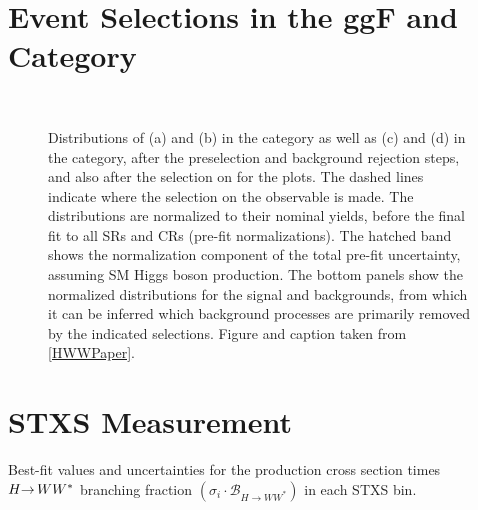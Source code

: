 \FloatBarrier
\section{Event Selections in the ggF \ZeroJet and \OneJet Category}

\begin{figure}[!h]
    \centering
     \\
  \caption{
  Distributions of (a) \mll and (b) \dphill in the \ZeroJet category as well as (c) \mll and (d) \dphill in the \OneJet category, after the preselection and background rejection steps, and also after the selection on \mll for the \dphill plots. The dashed lines indicate where the selection on the observable is made. The distributions are normalized to
  their nominal yields, before the final fit to all SRs and CRs (pre-fit normalizations). The hatched band shows the normalization component of the total pre-fit uncertainty, assuming SM Higgs boson production. The bottom panels show the normalized distributions for the signal and backgrounds, from which it can be inferred which background processes are primarily removed by the indicated selections.
  Figure and caption taken from \cref{HWWPaper}. 
  \label{fig:ggf:Plots:selections}
  }
  \end{figure}
  

\FloatBarrier
\section{STXS Measurement}
\label{app:stxs-measurement}
\begin{table}[htp]
    \caption{
    Best-fit values and uncertainties for the production cross section times $H{\rightarrow\,}WW^{\ast}$ branching fraction $({\sigma_i \cdot \mathcal{B}_{H \to WW^{\ast}}})$ in each STXS bin.
    }
    \begin{center}
      \small
      \renewcommand{\arraystretch}{1.5}
      \scalebox{0.90}{
        
      }
    \end{center}
    \label{tab:STXS-XSecs}
  \end{table}

